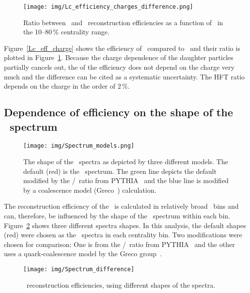 \begin{figure}[!htb]
\centering
\texttt{[image: img/Lc\_efficiency\_charges\_difference.png]}

\caption{\label{Lc_eff_ratio_charge} Ratio between \Lcplus\ and \Lcminus\ reconstruction efficiencies as a function of \pt\ in the 10--80$\,\%$ centrality range.}
\end{figure}

Figure~\ref{Lc_eff_charge} shows the efficiency of \Lcplus\ compared to \Lcminus\ and their ratio is plotted in Figure~\ref{Lc_eff_ratio_charge}\@. Because the charge dependence of the daughter particles partially cancels out, the of the efficiency does not depend on the charge very much and the difference can be cited as a systematic uncertainty.
The HFT ratio depends on the charge in the order of 2$\,\%$. 


\subsection{Dependence of efficiency on the shape of the \pt\ spectrum }
\begin{figure}[!htb]
\centering
\texttt{[image: img/Spectrum\_models.png]}

\caption{\label{spectrum_models} The shape of the \Lambdac\ spectra as depicted by three different models. The default (red) is the \dzero\ spectrum. The green line depicts the default modified by the \Lambdac/\dzero\ ratio from PYTHIA~\cite{PYTHIA8} and the blue line is modified by a coalescence model (Greco~\cite{GrecoCoalescence}) calculation.}
\end{figure}

The reconstruction efficiency of the \Lambdac\ is calculated in relatively broad \pt\ bins and can, therefore, be influenced by the shape of the \pt\ spectrum within each bin. Figure~\ref{spectrum_models} shows three different spectra shapes. In this analysis, the default shapes (red) were chosen as the \dzero\ spectra in each centrality bin. Two modifications were chosen for comparison: One is from the \Lambdac/\dzero\ ratio from PYTHIA~\cite{PYTHIA8} and the other uses a quark-coalescence model by the Greco group~\cite{GrecoCoalescence}\@.

\begin{figure}[!htb]
\centering
\texttt{[image: img/Spectrum\_difference]}

\caption{\label{spectrum_diff} \Lambdac\ reconstruction efficiencies, using different shapes of the spectra.}
\end{figure}

